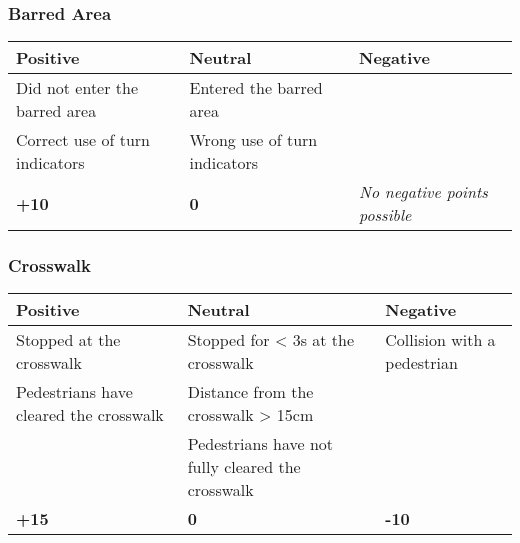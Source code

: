 {\begin{highlight}
		\subsubsection*{Barred Area}
		\begin{table}[H]
			\begin{tabularx}{\textwidth}{XXX}
				\toprule
				\textbf{Positive}              & \textbf{Neutral}             & \textbf{Negative}                    \\
				\midrule
				Did not enter the barred area  & Entered the barred area      &                                      \\
				Correct use of turn indicators & Wrong use of turn indicators &                                      \\
				\topstrut
				\textbf{+10}                   & \textbf{0}                   & \textit{No negative points possible} \\
				\bottomrule
			\end{tabularx}
		\end{table}
	\end{highlight}

	\subsubsection*{Crosswalk}
	\begin{table}[H]
		\begin{tabularx}{\textwidth}{XXX}
			\toprule
			\textbf{Positive}                         & \textbf{Neutral}                                    & \textbf{Negative}           \\
			\midrule
			Stopped at the crosswalk \footnotemark[5] & Stopped for < 3s at the crosswalk \footnotemark[5]  & Collision with a pedestrian \\
			Pedestrians have cleared the crosswalk    & Distance from the crosswalk > 15cm \footnotemark[5] &                             \\
			                                          & Pedestrians have not fully cleared the crosswalk    &                             \\
			\topstrut
			\textbf{+15}                              & \textbf{0}                                          & \textbf{-10}                \\
			\bottomrule
		\end{tabularx}
	\end{table}

	\newpage

}
